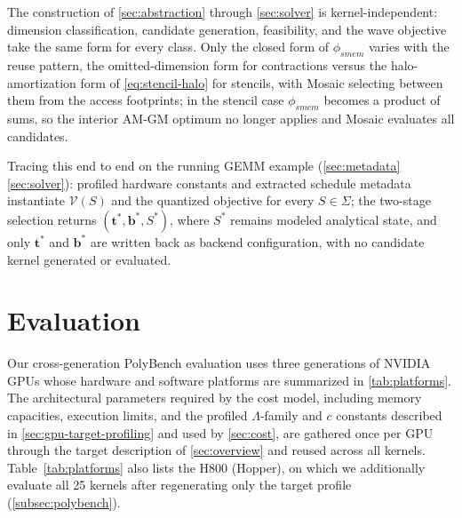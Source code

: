 \documentclass[acmsmall,review,anonymous,screen]{acmart}
\newif\ifrevmarkup %
\DeclareRobustCommand{\revRone}[1]{\ifrevmarkup{\color{revRone}\hypersetup{allcolors=revRone}#1}\else#1\fi} %
\newcommand{\name}{{Mosaic}\xspace}
\newcommand{\tvec}{\mathbf{t}}
\providecommand{\DIFaddbegin}{} %
\providecommand{\DIFaddend}{} %
\newcommand{\DIFaddincludegraphics}[2][]{{\color{blue}\fbox{\DIFOincludegraphics[#1]{#2}}}} %
\DeclareRobustCommand{\DIFaddbegin}{\DIFOaddbegin \let\includegraphics\DIFaddincludegraphics} %
\DeclareRobustCommand{\DIFaddend}{\DIFOaddend \let\includegraphics\DIFOincludegraphics} %
\begin{document}
The construction of \autoref{sec:abstraction} through \autoref{sec:solver} is kernel-independent: dimension classification, candidate generation, feasibility, and the wave objective take the same form for every class. Only the closed form of \(\phi_{\mathit{smem}}\) varies with the reuse pattern, the omitted-dimension form for contractions versus the halo-amortization form of \autoref{eq:stencil-halo} for stencils, with \name selecting between them from the access footprints; in the stencil case \(\phi_{\mathit{smem}}\) becomes a product of sums, so the interior AM-GM optimum no longer applies and \name evaluates all candidates.

Tracing this end to end on the running GEMM example (\autoref{sec:metadata}\textendash\autoref{sec:solver}): profiled hardware constants and extracted schedule metadata instantiate \(\mathcal{V}(S)\) and the quantized objective for every \(S\in\Sigma\); the two-stage selection returns \((\tvec^*,\mathbf{b}^*,S^*)\), where \(S^*\) remains modeled analytical state, and only \(\tvec^*\) and \(\mathbf{b}^*\) are written back as backend configuration, with no candidate kernel generated or evaluated.

\section{Evaluation}
\label{sec:eval}

Our cross-generation PolyBench evaluation uses three generations of NVIDIA GPUs whose hardware and software platforms are summarized in \autoref{tab:platforms}. The architectural parameters required by the cost model, including memory capacities, execution limits, and the profiled \(\Lambda\)-family and \(c\) constants described in \autoref{sec:gpu-target-profiling} and used by \autoref{sec:cost}, are gathered once per GPU through the target description of \autoref{sec:overview} and reused across all kernels. \DIFaddbegin \revRone{Table~\ref{tab:platforms} also lists the H800 (Hopper), on which we additionally evaluate all 25 kernels after regenerating only the target profile (\autoref{subsec:polybench}).}
\DIFaddend
\end{document}
